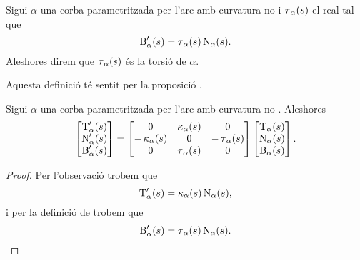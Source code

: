\documentclass[../../Main.tex]{subfiles}
\begin{document}
	\begin{definition}[Torsió]
		\label{def:torsió}
		Sigui \(\alpha\) una corba parametritzada per l'arc amb curvatura no \nulla{} i \(\operatorname{\tau}_{\alpha}(s)\) el real tal que
		\[\operatorname{B}'_{\alpha}(s)=\operatorname{\tau}_{\alpha}(s)\operatorname{N}_{\alpha}(s).\]
		Aleshores direm que \(\operatorname{\tau}_{\alpha}(s)\) és la torsió de \(\alpha\).
		
		Aquesta definició té sentit per la proposició .
	\end{definition}
	\begin{theorem}
		\label{thm:fórmules de Frenet per corbes parametritzades per l'arc}
		Sigui \(\alpha\) una corba parametritzada per l'arc amb curvatura no \nulla{}. Aleshores
		\[\begin{bmatrix}
			\operatorname{T}'_{\alpha}(s) \\
			\operatorname{N}'_{\alpha}(s) \\
			\operatorname{B}'_{\alpha}(s)
		\end{bmatrix}=
		\begin{bmatrix}
			0 & \operatorname{\kappa}_{\alpha}(s) & 0 \\
			-\operatorname{\kappa}_{\alpha}(s) & 0 & -\operatorname{\tau}_{\alpha}(s) \\
			0 & \operatorname{\tau}_{\alpha}(s) & 0
		\end{bmatrix}
		\begin{bmatrix}
			\operatorname{T}_{\alpha}(s) \\
			\operatorname{N}_{\alpha}(s) \\
			\operatorname{B}_{\alpha}(s)
		\end{bmatrix}.\]
		\begin{proof}
			Per l'observació  trobem que
			\begin{equation}
				\label{thm:fórmules de Frenet:eq1}
				\operatorname{T}_{\alpha}'(s)=\operatorname{\kappa}_{\alpha}(s)\operatorname{N}_{\alpha}(s),
			\end{equation}
			i per la definició de  trobem que
			\begin{equation}
				\label{thm:fórmules de Frenet:eq2}
				\operatorname{B}'_{\alpha}(s)=\operatorname{\tau}_{\alpha}(s)\operatorname{N}_{\alpha}(s).
			\end{equation}
			

\end{proof}
\end{theorem}
\end{document}
